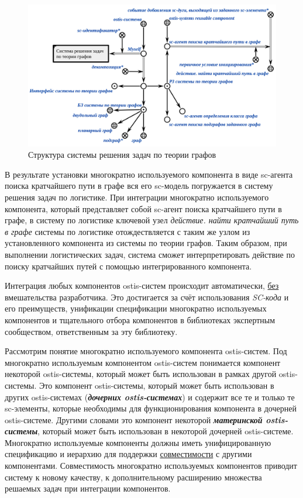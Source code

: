 \begin{figure}[H]
	\includegraphics[scale=0.4]{author/part5/figures/graph_theory_system.png}
	\caption{Структура системы решения задач по теории графов}
	\label{fig:graph_theory_system}
\end{figure}

В результате установки многократно используемого компонента в виде sc-агента поиска кратчайшего пути в графе вся его sc-модель погружается в систему решения задач по логистике. При интеграции многократно используемого компонента, который представляет собой sc-агент поиска кратчайшего пути в графе, в систему по логистике ключевой узел \textit{действие. найти кратчайший путь в графе} системы по логистике отождествляется с таким же узлом из установленного компонента из системы по теории графов. Таким образом, при выполнении логистических задач, система сможет интерпретировать действие по поиску кратчайших путей с помощью интегрированного компонента.

Интеграция любых компонентов ostis-систем происходит автоматически, \underline{без} вмешательства разработчика. Это достигается за счёт использования \textit{SC-кода} и его преимуществ, унификации спецификации многократно используемых компонентов и тщательного отбора компонентов в библиотеках экспертным сообществом, ответственным за эту библиотеку.

Рассмотрим понятие многократно используемого компонента ostis-систем. Под многократно используемым компонентом ostis-систем понимается  компонент некоторой ostis-системы, который может быть использован в рамках другой ostis-системы. Это компонент ostis-системы, который может быть использован в других ostis-системах (\textbf{\textit{дочерних ostis-системах}}) и содержит все те и только те sc-элементы, которые необходимы для функционирования компонента в дочерней ostis-системе. Другими словами это компонент некоторой \textbf{\textit{материнской ostis-системы}}, который может быть использован в некоторой дочерней ostis-системе. Многократно используемые компоненты должны иметь унифицированную спецификацию и иерархию для поддержки \underline{совместимости} с другими компонентами. Совместимость многократно используемых компонентов приводит систему к новому качеству, к дополнительному расширению множества решаемых задач при интеграции компонентов.

